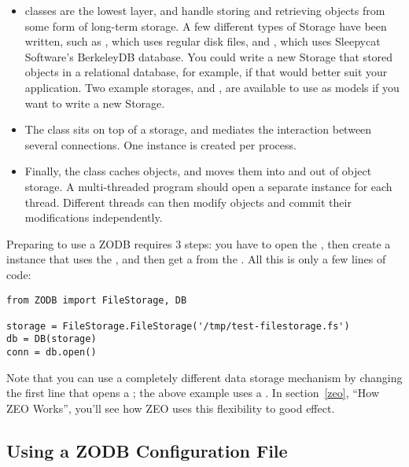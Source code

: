 \begin{itemize}
 \item {} classes are the lowest layer, and handle
 storing and retrieving objects from some form of long-term storage.
 A few different types of Storage have been written, such as
 , which uses regular disk files, and
 , which uses Sleepycat Software's BerkeleyDB
 database.  You could write a new Storage that stored objects in a
 relational database, for example, if that would
 better suit your application.  Two example storages,
  and , are available to use
 as models if you want to write a new Storage.

 \item The  class sits on top of a storage, and mediates the
 interaction between several connections.  One  instance is
 created per process.

 \item Finally, the  class caches objects, and moves
 them into and out of object storage.  A multi-threaded program should
 open a separate  instance for each thread.
 Different threads can then modify objects and commit their
 modifications independently.

\end{itemize}

Preparing to use a ZODB requires 3 steps: you have to open the
, then create a  instance that uses the
, and then get a  from the .  All this is only a few lines of code:

\begin{verbatim}
from ZODB import FileStorage, DB

storage = FileStorage.FileStorage('/tmp/test-filestorage.fs')
db = DB(storage)
conn = db.open()
\end{verbatim}

Note that you can use a completely different data storage mechanism by
changing the first line that opens a ; the above example uses a
.  In section~\ref{zeo}, ``How ZEO Works'',
you'll see how ZEO uses this flexibility to good effect.

\subsection{Using a ZODB Configuration File}

